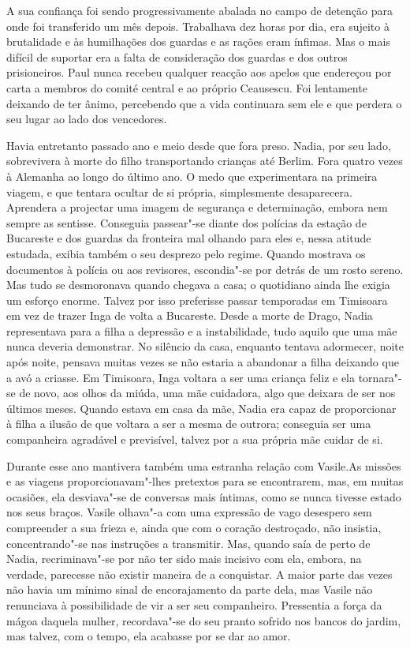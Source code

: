 A sua confiança foi sendo progressivamente abalada no campo de detenção
para onde foi transferido um mês depois. Trabalhava dez horas por dia,
era sujeito à brutalidade e às humilhações dos guardas e as rações
eram ínfimas. Mas o mais difícil de suportar era a falta de consideração dos guardas e dos outros prisioneiros. Paul nunca recebeu
qualquer reacção aos apelos que endereçou por carta a membros do comité
central e ao próprio Ceausescu. Foi lentamente deixando de ter ânimo,
percebendo que a vida continuara sem ele e que perdera o seu lugar ao
lado dos vencedores.

Havia entretanto passado ano e meio desde que fora preso. Nadia, por seu
lado, sobrevivera à morte do filho transportando crianças até Berlim.
Fora quatro vezes à Alemanha ao longo do último ano. O medo que
experimentara na primeira viagem, e que tentara ocultar de si própria,
simplesmente desaparecera. Aprendera a projectar uma imagem de segurança
e determinação, embora nem sempre as sentisse. Conseguia passear"-se
diante dos polícias da
estação de Bucareste e dos guardas da fronteira mal olhando para eles e,
nessa atitude estudada, exibia também o seu desprezo pelo regime. Quando
mostrava os documentos à polícia ou aos revisores, escondia"-se por
detrás de um rosto sereno. Mas tudo se desmoronava quando chegava a
casa; o quotidiano ainda lhe exigia um esforço enorme. Talvez por isso
preferisse passar temporadas em Timisoara em vez de trazer Inga de volta
a Bucareste. Desde a morte de Drago, Nadia representava para a filha a
depressão e a instabilidade, tudo aquilo que uma mãe nunca deveria
demonstrar. No silêncio da casa, enquanto tentava adormecer, noite após
noite, pensava muitas vezes se não estaria a abandonar a filha deixando
que a avó a criasse. Em Timisoara, Inga voltara a ser uma criança feliz
e ela tornara"-se de novo, aos olhos da miúda, uma mãe cuidadora, algo
que deixara de ser nos últimos meses. Quando estava em casa da mãe,
Nadia era capaz de proporcionar à filha a ilusão de que voltara a ser a
mesma de outrora; conseguia ser uma companheira agradável e
previsível, talvez por a sua própria mãe cuidar de si.

Durante esse ano mantivera também uma estranha
relação com Vasile.As missões e as viagens proporcionavam"-lhes pretextos para se encontrarem, mas, em muitas ocasiões, ela
desviava"-se de conversas mais íntimas, como se nunca tivesse estado nos
seus braços. Vasile olhava"-a com uma expressão de vago desespero sem
compreender a sua frieza e, ainda que com o coração destroçado, não
insistia, concentrando"-se nas instruções a transmitir. Mas, quando saía
de perto de Nadia, recriminava"-se por não ter sido mais incisivo com
ela, embora, na verdade, parecesse não
existir maneira de a conquistar. A maior parte das vezes não havia um
mínimo sinal de encorajamento da parte dela, mas Vasile não renunciava à
possibilidade de vir a ser seu companheiro. Pressentia a força da mágoa
daquela mulher, recordava"-se do seu pranto sofrido nos bancos do jardim,
mas talvez, com o tempo, ela acabasse por se dar ao amor.

